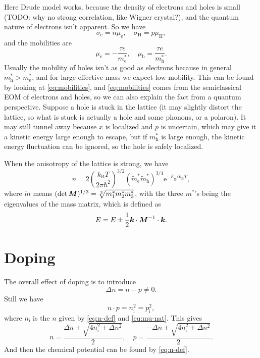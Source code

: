 \documentclass[hyperref, a4paper]{article}
\newcommand*{\ee}{\mathrm{e}}
\begin{document}
Here Drude model works, because the density of electrons and holes is small 
(TODO: why no strong correlation, like Wigner crystal?),
and the quantum nature of electrons isn't apparent.
So we have 
\begin{equation}
    \sigma_\text{e} = n \mu_{\text{e}}, \quad 
    \sigma_{\text{H}} = p \mu_{\text{H}},
\end{equation}
and the mobilities are 
\begin{equation}
    \mu_{\text{e}} = - \frac{\tau e}{m^*_{\text{e}}}, \quad 
    \mu_{\text{h}} =   \frac{\tau e}{m^*_{\text{h}}}.
    \label{eq:mobilities}
\end{equation}
Usually the mobility of holes isn't as good as electrons because in general 
$m_{\text{h}}^* > m_{\text{e}}^*$,
and for large effective mass we expect low mobility.
This can be found by looking at \eqref{eq:mobilities},
and \eqref{eq:mobilities} comes from the semiclassical EOM of electrons and holes,
so we can also explain the fact from a quantum perspective.
Suppose a hole is stuck in the lattice 
(it may slightly distort the lattice,
so what is stuck is actually a hole and some phonons, 
or a polaron).
It may still tunnel away because $x$ is localized 
and $p$ is uncertain, which may give it a kinetic energy large enough to escape,
but if $m^*_{\text{h}}$ is large enough, 
the kinetic energy fluctuation can be ignored,
so the hole is safely localized.

When the anisotropy of the lattice is strong, we have 
\begin{equation}
    n = 2 \left( \frac{k_{\text{B}} T}{2 \pi \hbar^2} \right)^{3/2} (\tilde{m}_{\text{e}}^* \tilde{m}_{\text{h}}^*)^{3/4} \ee^{- E_{\text{g}} / k_{\text{B}} T},
\end{equation}
where $\tilde{m}$ means $(\det \vb*{M})^{1/3} = \sqrt[3]{m_1^* m_2^* m_3^*}$,
with the three $m^*$'s being the eigenvalues of the mass matrix,
which is defined as 
\begin{equation}
    E = E \pm \frac{1}{2} \vb*{k} \cdot \vb*{M}^{-1} \cdot \vb*{k}.
\end{equation}

\section{Doping}

The overall effect of doping is to introduce 
\begin{equation}
    \Delta n = n - p \neq 0.
\end{equation}
Still we have 
\begin{equation}
    n \cdot p = n_{\text{i}}^2 = p_{\text{i}}^2,
\end{equation}
where $n_{\text{i}}$ is the $n$ given by \eqref{eq:n-def} and \eqref{eq:mu-nat}.
This gives 
\begin{equation}
    n = \frac{\Delta n + \sqrt{4 n_{\text{i}}^2 + \Delta n^2}}{2}, \quad 
    p = \frac{-\Delta n + \sqrt{4 n_{\text{i}}^2 + \Delta n^2}}{2}.
\end{equation}
And then the chemical potential can be found by \eqref{eq:n-def}.
\end{document}
